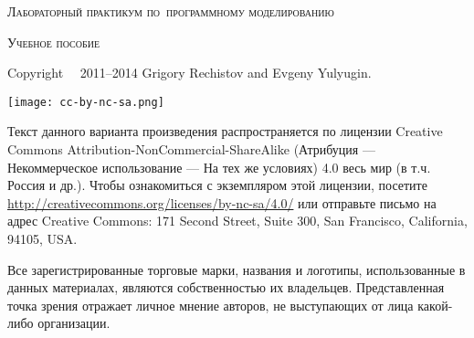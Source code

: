 
\thispagestyle{empty}

\begin{center}
	\huge\textsc{Лабораторный практикум по~программному моделированию}\par
	
	\bigskip
	
	\Large\textsc{Учебное пособие}
\end{center}


\newlength{\centeroffset}
\setlength{\centeroffset}{-0.5\oddsidemargin}
\addtolength{\centeroffset}{0.5\evensidemargin}

\noindent\hspace*{\centeroffset}
\pagebreak

\thispagestyle{empty}
\begin{small} 
Copyright \textcopyright~~2011--2014 Grigory Rechistov and Evgeny Yulyugin.

\begin{center}
	\texttt{[image: cc-by-nc-sa.png]}
\end{center}

Текст данного варианта произведения распространяется по лицензии Creative Commons At\-tri\-bu\-tion-Non\-Com\-mer\-cial-Share\-Alike (Атрибуция — Некоммерческое использование — На тех же условиях) 4.0 весь мир (в т.ч. Россия и др.). Чтобы ознакомиться с экземпляром этой лицензии, посетите \url{http://creativecommons.org/licenses/by-nc-sa/4.0/} или отправьте письмо на адрес Creative Commons: 171 Second Street, Suite 300, San Francisco, California, 94105, USA. 

Все зарегистрированные торговые марки, названия и логотипы, использованные в данных материалах, являются собственностью их владельцев. Представленная точка зрения отражает личное мнение авторов, не выступающих от лица какой-либо организации.
\end{small}
